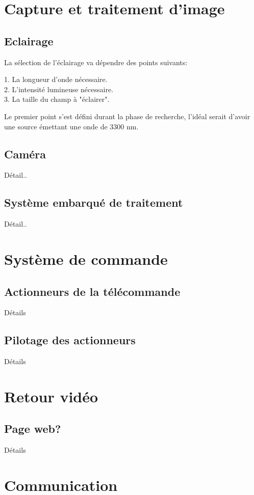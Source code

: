 \section{Capture et traitement d'image}
\subsection{Eclairage}
La sélection de l'éclairage va dépendre des points suivants:
\begin{listage}
    1. La longueur d'onde nécessaire.\\
    2. L'intensité lumineuse nécessaire.\\
    3. La taille du champ à "éclairer".
\end{listage}
Le premier point s'est défini durant la phase de recherche, l'idéal serait d'avoir une source émettant une onde de 3300 \si{\nano\metre}.

\subsection{Caméra}
Détail..
\subsection{Système embarqué de traitement}
Détail..

\section{Système de commande}
\subsection{Actionneurs de la télécommande}
Détails
\subsection{Pilotage des actionneurs}
Détails
\section{Retour vidéo}
\subsection{Page web?}
Détails
\section{Communication}
